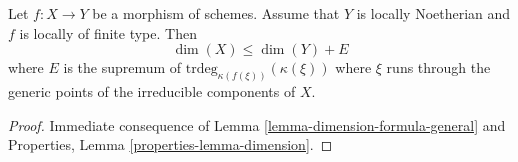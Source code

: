 \begin{lemma}
\label{lemma-alteration-dimension-general}
Let $f : X \to Y$ be a morphism of schemes. Assume that
$Y$ is locally Noetherian and $f$ is locally of finite type.
Then
$$
\dim(X) \leq \dim(Y) + E
$$
where $E$ is the supremum of $\text{trdeg}_{\kappa(f(\xi))}(\kappa(\xi))$
where $\xi$ runs through the generic points of the irreducible components
of $X$.
\end{lemma}

\begin{proof}
Immediate consequence of Lemma \ref{lemma-dimension-formula-general}
and Properties, Lemma \ref{properties-lemma-dimension}.
\end{proof}








